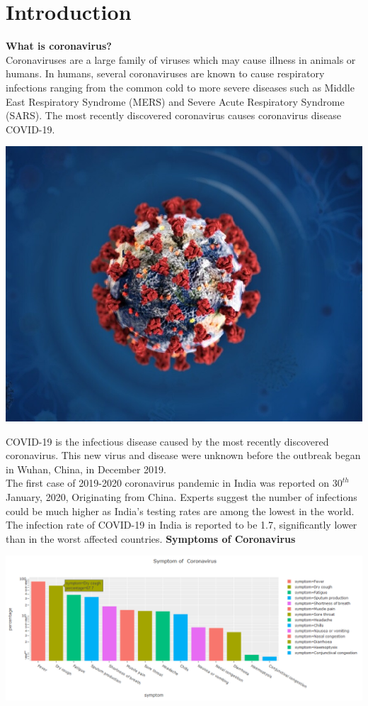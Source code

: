 \documentclass{article}
\begin{document}
\section*{Introduction}
\textbf{What is coronavirus?}
\\Coronaviruses are a large family of viruses which may cause illness in animals or humans.  In humans, several coronaviruses are known to cause respiratory infections ranging from the common cold to more severe diseases such as Middle East Respiratory Syndrome (MERS) and Severe Acute Respiratory Syndrome (SARS). The most recently discovered coronavirus causes coronavirus disease COVID-19.
\begin{center}
\includegraphics[scale=0.3]{corona_0.jpeg}\newline
\end{center}
COVID-19 is the infectious disease caused by the most recently discovered coronavirus. This new virus and disease were unknown before the outbreak began in Wuhan, China, in December 2019.\newline
\\The first case of 2019-2020 coronavirus pandemic in India was reported on $30^{th}\:$ January, 2020, Originating from China.  
Experts suggest the number of infections could be much higher as India's testing rates are among the lowest in the world. The infection rate of COVID-19 in India is reported to be 1.7, significantly lower than in the worst affected countries.\newline
\clearpage
\textbf{Symptoms of Coronavirus}
\begin{center}
\includegraphics[scale=0.5]{corona_1_symptoms.png}
\end{center}
\end{document}
